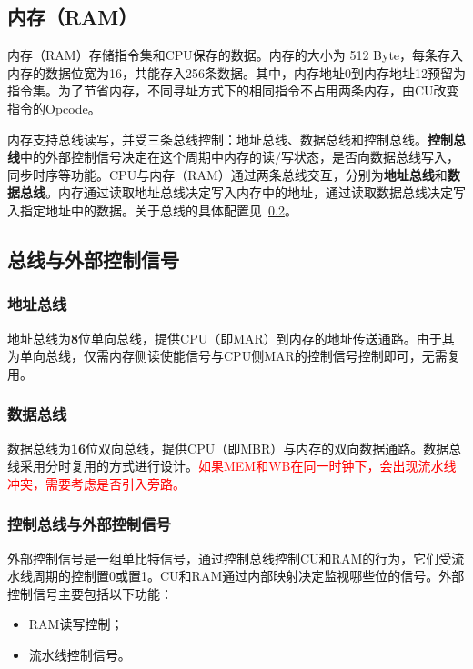 \documentclass[lang=cn,a4paper,newtx]{elegantpaper}
\begin{document}
\subsection{内存（RAM）}
内存（RAM）存储指令集和CPU保存的数据。内存的大小为 512 Byte，每条存入内存的数据位宽为16，共能存入256条数据。其中，内存地址0到内存地址12预留为指令集。为了节省内存，不同寻址方式下的相同指令不占用两条内存，由CU改变指令的Opcode。

内存支持总线读写，并受三条总线控制：地址总线、数据总线和控制总线。\textbf{控制总线}中的外部控制信号决定在这个周期中内存的读/写状态，是否向数据总线写入，同步时序等功能。CPU与内存（RAM）通过两条总线交互，分别为\textbf{地址总线}和\textbf{数据总线}。内存通过读取地址总线决定写入内存中的地址，通过读取数据总线决定写入指定地址中的数据。关于总线的具体配置见~\ref{sec:ExternalControl}。

\subsection{总线与外部控制信号}\label{sec:ExternalControl}

\subsubsection{地址总线}
地址总线为\textbf{8}位单向总线，提供CPU（即MAR）到内存的地址传送通路。由于其为单向总线，仅需内存侧读使能信号与CPU侧MAR的控制信号控制即可，无需复用。
\subsubsection{数据总线}
数据总线为\textbf{16}位双向总线，提供CPU（即MBR）与内存的双向数据通路。数据总线采用分时复用的方式进行设计。\textcolor{red}{如果MEM和WB在同一时钟下，会出现流水线冲突，需要考虑是否引入旁路。}
\subsubsection{控制总线与外部控制信号}
外部控制信号是一组单比特信号，通过控制总线控制CU和RAM的行为，它们受流水线周期的控制置0或置1。CU和RAM通过内部映射决定监视哪些位的信号。外部控制信号主要包括以下功能：
\begin{itemize}
  \item RAM读写控制；
  \item 流水线控制信号。
\end{itemize}
\end{document}
